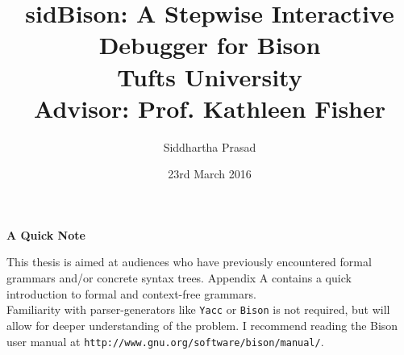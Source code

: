 \documentclass {report}
\title {
	{sidBison: A Stepwise Interactive Debugger for Bison\\[0.4in]}
	{ Tufts University\\[0.2in]}
	{\large Advisor: Prof. Kathleen Fisher\\}
}
\author {Siddhartha Prasad}
\date{23rd March 2016}
\begin{document}
\maketitle



\pagebreak
\tableofcontents
\pagebreak

\thispagestyle{plain}
\begin{center}
    \textbf{A Quick Note}
\end{center}

\noindent

This thesis is aimed at audiences who have previously encountered formal grammars and/or concrete syntax trees.
Appendix A contains a quick introduction to formal and context-free grammars.\\

Familiarity with parser-generators like \verb|Yacc| or \verb|Bison| is not required, but will allow for deeper understanding of the problem. I recommend reading the Bison user manual at \verb|http://www.gnu.org/software/bison/manual/|.

\pagebreak

















\printbibliography
\end{document}
